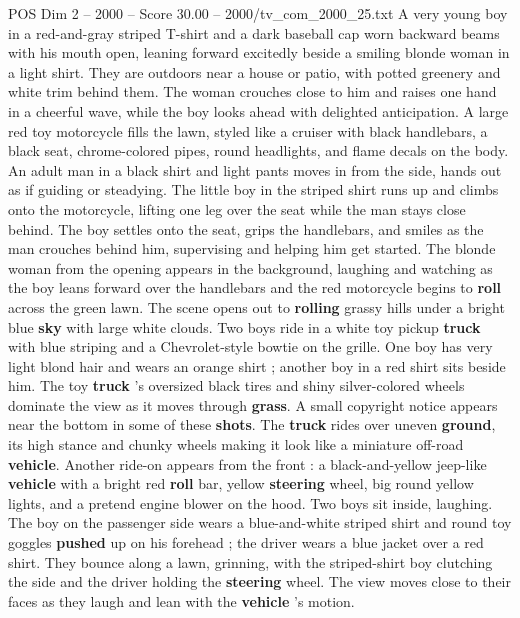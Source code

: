 \begin{textsample}{POS Dim 2 – 2000 – Score 30.00 – 2000/tv\_com\_2000\_25.txt}  \label{ex:f2_pos_022}
A very young boy in a red-and-gray striped T-shirt and a dark baseball cap worn backward beams with his mouth open, leaning forward excitedly beside a smiling blonde woman in a light shirt.
They are outdoors near a house or patio, with potted greenery and white trim behind them.
The woman crouches close to him and raises one hand in a cheerful wave, while the boy looks ahead with delighted anticipation.
A large red toy motorcycle fills the lawn, styled like a cruiser with black handlebars, a black seat, chrome-colored pipes, round headlights, and flame decals on the body.
An adult man in a black shirt and light pants moves in from the side, hands out as if guiding or steadying.
The little boy in the striped shirt runs up and climbs onto the motorcycle, lifting one leg over the seat while the man stays close behind.
The boy settles onto the seat, grips the handlebars, and smiles as the man crouches behind him, supervising and helping him get started.
The blonde woman from the opening appears in the background, laughing and watching as the boy leans forward over the handlebars and the red motorcycle begins to \textbf{roll} across the green lawn.
The scene opens out to \textbf{rolling} grassy hills under a bright blue \textbf{sky} with large white clouds.
Two boys ride in a white toy pickup \textbf{truck} with blue striping and a Chevrolet-style bowtie on the grille.
One boy has very light blond hair and wears an orange shirt ; another boy in a red shirt sits beside him.
The toy \textbf{truck} ’s oversized black tires and shiny silver-colored wheels dominate the view as it moves through \textbf{grass}.
A small copyright notice appears near the bottom in some of these \textbf{shots}.
The \textbf{truck} rides over uneven \textbf{ground}, its high stance and chunky wheels making it look like a miniature off-road \textbf{vehicle}.
Another ride-on appears from the front : a black-and-yellow jeep-like \textbf{vehicle} with a bright red \textbf{roll} bar, yellow \textbf{steering} wheel, big round yellow lights, and a pretend engine blower on the hood.
Two boys sit inside, laughing.
The boy on the passenger side wears a blue-and-white striped shirt and round toy goggles \textbf{pushed} up on his forehead ; the driver wears a blue jacket over a red shirt.
They bounce along a lawn, grinning, with the striped-shirt boy clutching the side and the driver holding the \textbf{steering} wheel.
The view moves close to their faces as they laugh and lean with the \textbf{vehicle} ’s motion.

\end{textsample}

